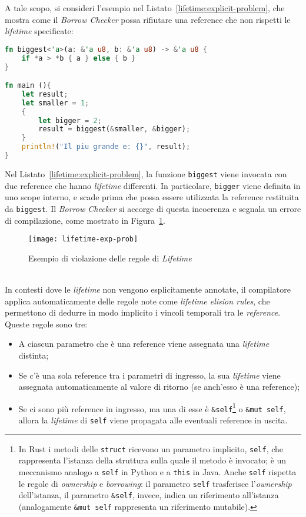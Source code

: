 A tale scopo, si consideri l'esempio nel Listato~\ref{lifetime:explicit-problem}, che mostra come il \textit{Borrow Checker} possa rifiutare una reference che non rispetti le \textit{lifetime} specificate:
\begin{lstlisting}[language=Rust, caption={Limitazioni delle \textit{lifetime}}, label={lifetime:explicit-problem}]
fn biggest<'a>(a: &'a u8, b: &'a u8) -> &'a u8 {
    if *a > *b { a } else { b }
}

fn main (){
    let result;
    let smaller = 1;
    {
        let bigger = 2;
        result = biggest(&smaller, &bigger);
    }
    println!("Il piu grande e: {}", result);
}
\end{lstlisting}
Nel Listato~\ref{lifetime:explicit-problem}, la funzione \texttt{biggest} viene invocata con due reference che hanno \textit{lifetime} differenti. In particolare, \texttt{bigger} viene definita in uno scope interno, e scade prima che possa essere utilizzata la reference restituita da \texttt{biggest}. Il \textit{Borrow Checker} si accorge di questa incoerenza e segnala un errore di compilazione, come mostrato in Figura~\ref{lifetime:exp-prob-compile}.
\begin{figure}[htbp]
    \begin{center}
        \texttt{[image: lifetime-exp-prob]}
        \caption{Esempio di violazione delle regole di \textit{Lifetime}}\label{lifetime:exp-prob-compile}
    \end{center}
\end{figure}
\vspace{0pt}\\
\noindent In contesti dove le \textit{lifetime} non vengono esplicitamente annotate, il compilatore applica automaticamente delle regole note come \textit{lifetime elision rules}, che permettono di dedurre in modo implicito i vincoli temporali tra le \textit{reference}. Queste regole sono tre:
\begin{itemize}
    \item A ciascun parametro che è una reference viene assegnata una \textit{lifetime} distinta;
    \item Se c'è una sola reference tra i parametri di ingresso, la sua \textit{lifetime} viene assegnata automaticamente al valore di ritorno (se anch'esso è una reference);
    \item Se ci sono più reference in ingresso, ma una di esse è \texttt{\&self}\footnote{In Rust i metodi delle \texttt{struct} ricevono un parametro implicito, \texttt{self}, che rappresenta l'istanza della struttura sulla quale il metodo è invocato; è un meccanismo analogo a \texttt{self} in Python e a \texttt{this} in Java. Anche \texttt{self} rispetta le regole di \textit{ownership} e \textit{borrowing}: il parametro \texttt{self} trasferisce l'\textit{ownership} dell'istanza, il parametro \texttt{\&self}, invece, indica un riferimento all'istanza (analogamente \texttt{\&mut self} rappresenta un riferimento mutabile).} o \texttt{\&mut self}, allora la \textit{lifetime} di \texttt{self} viene propagata alle eventuali reference in uscita.
\end{itemize}
